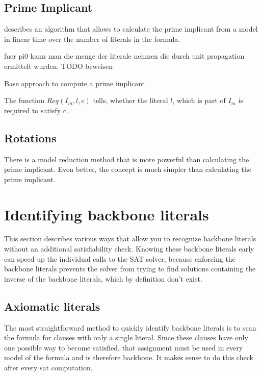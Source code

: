 \subsection{Prime Implicant}
\cite{dflbm13} describes an algorithm that allows to calculate the prime implicant from a model in linear time over the number of literals in the formula.


fuer pi0 kann man die menge der literale nehmen die durch unit propagation ermittelt wurden. TODO beweisen

\begin{algorithm}
\caption{{\sc Base approach to compute a prime implicant }}
\DontPrintSemicolon
{}

\;

\end{algorithm}

The function $Req(I_m,l,c)$ tells, whether the literal $l$, which is part of $I_m$ is required to satisfy c.

\subsection{Rotations}
There is a model reduction method that is more powerful than calculating the prime implicant. Even better, the concept is much simpler than calculating the prime implicant.






\section{Identifying backbone literals}
This section describes various ways that allow you to recognize backbone literals without an additional satisfiability check. Knowing these backbone literals early can speed up the individual calls to the SAT solver, because enforcing the backbone literals prevents the solver from trying to find solutions containing the inverse of the backbone literals, which by definition don't exist. 


\subsection{Axiomatic literals}
The most straightforward method to quickly identify backbone literals is to scan the formula for clauses with only a single literal. Since these clauses have only one possible way to become satisfied, that assignment must be used in every model of the formula and is therefore backbone. It makes sense to do this check after every sat computation.


